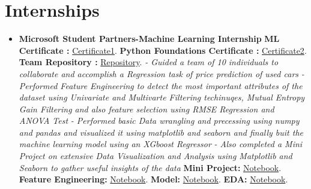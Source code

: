 \documentclass[a4paper,12pt]{article}
\begin{document}
\section*{Internships}
\begin{itemize}
    \item{\textbf{\large{Microsoft Student Partners-Machine Learning Internship}}
          \newline
          \textbf{ ML Certificate :} \href{https://github.com/teetangh/Kaustav-All-Certifications/blob/master/Artificial%20Intelligence/MSP%20ML%20Internship/internship%20certificate.jpg}{Certificate1}.
          \textbf{ Python Foundations Certificate :} \href{https://github.com/teetangh/Kaustav-All-Certifications/blob/master/Artificial%20Intelligence/MSP%20ML%20Internship/Course%20Completion%20Certificate.jpg}{Certificate2}.
          \textbf{ Team Repository :} \href{https://github.com/Microsoft-ML-Internship-Team/Major-Project-Submissions}{Repository}.
          \newline
          \textit{- Guided a team of 10 individuals to collaborate and accomplish a Regression task of price prediction of used cars}
          \newline
          \textit{- Performed Feature Engineering to detect the most important attributes of the dataset using Univariate and Multivarte Filtering techinuqes, Mutual Entropy Gain Filtering and also feature selection using RMSE Regression and ANOVA Test  }
          \newline
          \textit{- Performed basic Data wrangling and precessing using numpy and pandas and visualized it using matplotlib and seaborn and finally buit the machine learning model using an XGboost Regressor }
          \newline
          \textit{- Also completed a Mini Project on extensive Data Visualization and Analysis using Matplotlib and Seaborn to gather useful insights of the data}
          \newline
          \textbf{ Mini Project:} \href{https://github.com/teetangh/Microsoft-Machine-Learning-Internship/blob/master/MINOR%20PROJECT/Microsoft_Minor_Project_v2.ipynb}{Notebook}.
              \newline
              \textbf{ Feature Engineering:} \href{https://github.com/Microsoft-ML-Internship-Team/Major-Project-Submissions/blob/master/KAUSTAV/02_Kaustav_feature_engineering_v4.ipynb}{Notebook}.
              \textbf{ Model:} \href{https://github.com/Microsoft-ML-Internship-Team/Major-Project-Submissions/blob/master/KAUSTAV/03_Kaustav_Buidling_the_model_v1.ipynb}{Notebook}.
              \textbf{ EDA:} \href{https://github.com/Microsoft-ML-Internship-Team/Major-Project-Submissions/blob/master/KAUSTAV/01_Kaustav_data_preprocess_EDA_v7.ipynb}{Notebook}.}
\end{itemize}
\end{document}
